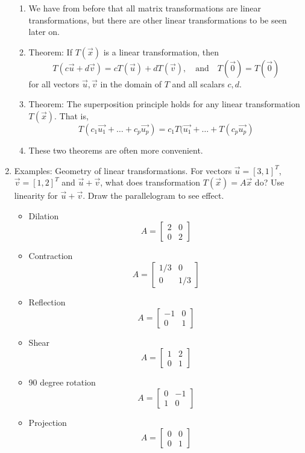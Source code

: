 \documentclass{article}
\begin{document}
\begin{enumerate}
\begin{enumerate}
\item We have from before that all matrix transformations are linear transformations, but there are other linear transformations to be seen later on.

\item Theorem: If $T(\vec{x})$ is a linear transformation, then
\[
T(c\vec{u}+d\vec{v}) = cT(\vec{u})+dT(\vec{v}), 
\quad \text{and} \quad 
T(\vec{0}) = T(\vec{0})
\]
for all vectors $\vec{u}, \vec{v}$ in the domain of $T$ and all scalars $c, d$.

\item Theorem: The superposition principle holds for any linear transformation $T(\vec{x})$. That is,
\[
T(c_1 \vec{u_1} + \dots + c_p \vec{u_p}) = 
c_1 T(\vec{u_1} + \dots + T(c_p \vec{u_p})
\]

\item These two theorems are often more convenient.
\end{enumerate}

\item Examples: Geometry of linear transformations. For vectors $\vec{u}=[3,1]^T$, $\vec{v}=[1,2]^T$ and $\vec{u}+\vec{v}$, what does transformation $T(\vec{x})=A\vec{x}$ do? Use linearity for $\vec{u}+\vec{v}$. Draw the parallelogram to see effect.
\begin{itemize}
\item Dilation 
\[
A = \left[ \begin{array}{cc}
2 & 0 \\
0 & 2
\end{array} \right]
\]
\item Contraction 
\[
A = \left[ \begin{array}{cc}
1/3 & 0 \\
0 & 1/3
\end{array} \right]
\]
\item Reflection 
\[
A = \left[ \begin{array}{cc}
-1 & 0 \\
0 & 1
\end{array} \right]
\]
\item Shear 
\[
A = \left[ \begin{array}{cc}
1 & 2 \\
0 & 1
\end{array} \right]
\]
\item 90 degree rotation 
\[
A = \left[ \begin{array}{cc}
0 & -1 \\
1 & 0
\end{array} \right]
\]
\item Projection
\[
A = \left[ \begin{array}{cc}
0 & 0 \\
0 & 1
\end{array} \right]
\]


\end{itemize}
\end{enumerate}
\end{document}
